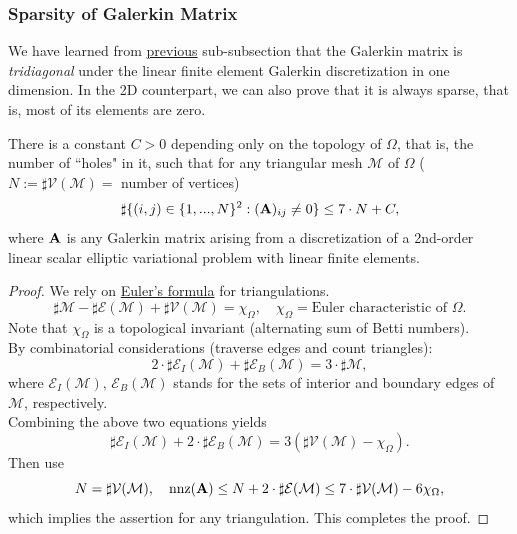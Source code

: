 	\subsubsection{Sparsity of Galerkin Matrix}
	We have learned from \hyperref[subsubsection.2.2.1]{previous}  
	sub-subsection that the Galerkin matrix is \emph{tridiagonal} under the 
	linear 	finite element Galerkin discretization in one dimension. In the
	2D counterpart, we can	also prove that it is always sparse, that is,
	most of its elements are zero.
	\begin{lemma}
	\label{lma:Sparsity of Galerkin matrix}
	There is a constant $C>0$ depending only on the topology of $\Omega$,
	that is, the number of ``holes" in it, such that for any triangular mesh
	$\mathcal{M}$ of $\Omega$ ($N:=\sharp\mathcal{V}(\mathcal{M})=$ 
	number of vertices)
	\[\sharp\{(i,j)\in\{1,...,N\}^2:(\mathbf{A})_{ij}\neq0\}\leq 7\cdot N + C,\]
	where $\mathbf{A}$ is any Galerkin matrix arising from a discretization of 
	a 2nd-order linear scalar elliptic variational problem with linear finite 
	elements.
	\end{lemma}
	\begin{proof}
	We rely on \href{https://en.wikipedia.org/wiki/Euler_characteristic}
	{Euler's formula} for triangulations.
	\[\sharp\mathcal{M}-\sharp\mathcal{E}(\mathcal{M})+
	\sharp\mathcal{V}(\mathcal{M})=\chi_\Omega,\quad \chi_\Omega=
	\textrm{Euler characteristic of } \Omega.\]
	Note that $\chi_\Omega$ is a topological invariant (alternating sum of 
	Betti numbers).\\
	By combinatorial considerations (traverse edges and count triangles):
	\[2\cdot\sharp\mathcal{E}_I(\mathcal{M})+\sharp\mathcal{E}_B(\mathcal{M})
		= 3\cdot\sharp\mathcal{M},\]
	where $\mathcal{E}_I(\mathcal{M}),\,\mathcal{E}_B(\mathcal{M})$ stands for
	the sets of interior and boundary edges of $\mathcal{M}$, respectively.\\
	Combining the above two equations yields
	\[\sharp\mathcal{E}_I(\mathcal{M})+2\cdot\sharp\mathcal{E}_B(\mathcal{M})
		= 3(\sharp\mathcal{V}(\mathcal{M})-\chi_\Omega).\]
	Then use
	\[N=\sharp\mathcal{V}(\mathcal{M}),\quad 
	\mathrm{nnz}(\mathbf{A})\leq N+2\cdot\sharp\mathcal{E}(\mathcal{M})
	\leq 7\cdot\sharp\mathcal{V}(\mathcal{M})-6\chi_\Omega,
	\]
	which implies the assertion for any triangulation.
	This completes the proof.
	\end{proof}
	
